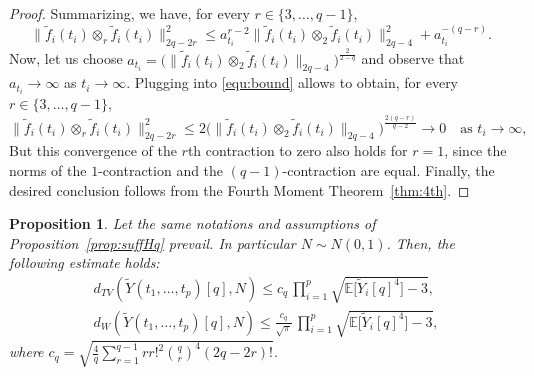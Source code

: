 \documentclass[12pt]{article}
\DeclareMathOperator{\1}{1}
\newcommand{\E}{\mathbb{E}}
\theoremstyle{plain}
\newtheorem{proposition}[theorem]{Proposition}
\theoremstyle{definition}
\begin{document}
\begin{proof}
Summarizing, we have, for every $r\in\{3,\dots,q-1\}$,
\begin{equation}
    \label{equ:bound}
    \| \widetilde  f_i(t_i)\otimes_{ r }  \widetilde  f_i(t_i)\|_{2q-2r }^2\le a_{t_i}^{r-2}\|  \widetilde f_i(t_i)\otimes_{2}  \widetilde f_i(t_i)\|_{2q-4}^2+a_{t_i}^{-(q-r)}.
\end{equation}
Now, let us choose $a_{t_i} =\big(\|\widetilde  f_i({t_i})\otimes_{2} \widetilde  f_i({t_i})\|_{2q-4}\big)^{\frac2{2-q}}$ and
observe that $a_{t_i}\to\infty$ as $t_i\to\infty$.
Plugging into \eqref{equ:bound} allows to obtain, for every $r\in\{3,\dots,q-1\}$,
$$
\| \widetilde  f_i({t_i})\otimes_{ r }  \widetilde  f_i({t_i})\|_{2q-2r }^2\leq 2
\big(\|\widetilde  f_i({t_i})\otimes_{2} \widetilde  f_i({t_i})\|_{2q-4}\big)^{\frac{2(q-r)}{q-2}}
\to 0\quad\mbox{as $t_i\to\infty$},
$$
But this convergence of the $r$th contraction to zero also holds for $r=1$, since the norms of the $1$-contraction and the $(q-1)$-contraction are equal.
Finally, the desired conclusion follows from the Fourth Moment Theorem~\ref{thm:4th}. \end{proof}

\begin{proposition}\label{prop:quantHq}
    Let the same notations and assumptions of Proposition~\ref{prop:suffHq} prevail. In particular $N\sim N(0,1)$.
    Then, the following estimate holds: 
    \begin{align}\label{equ:quantHqLe}
        &d_{TV}(\widetilde Y{(t_1,\ldots,t_p)}[q],N)\le c_q \, \prod_{i=1}^p \sqrt{\E\big[\widetilde Y_i[q]^4\big]-3}, \\
        &{d_{W}(\widetilde Y{(t_1,\ldots,t_p)}[q],N)\le \frac{c_q}{\sqrt{\pi}} \, \prod_{i=1}^p \sqrt{\E\big[\widetilde Y_i[q]^4\big]-3},}
    \end{align}
    where $c_q=\sqrt{\frac{4}{q}\sum_{r=1}^{q-1}rr!^2\binom{q}{r}^4(2q-2r)!}$.
\end{proposition}
\end{document}
